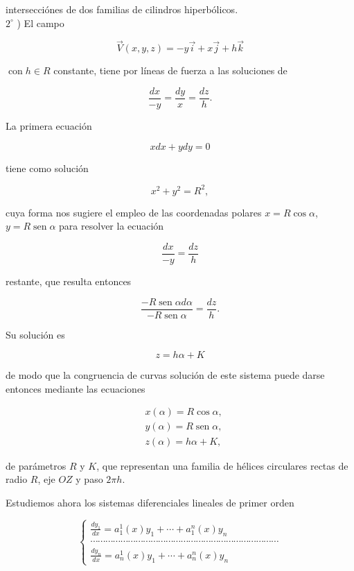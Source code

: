 \documentclass[10pt]{article}
\theoremstyle{plain}
\theoremstyle{definition}
\theoremstyle{remark}
\begin{document}
intersecciónes de dos familias de cilindros hiperbólicos.\\
$2^{\circ}$ ) El campo

$$
\vec{V}(x, y, z)=-y \vec{i}+x \vec{j}+h \vec{k}
$$

$\operatorname{con} h \in R$ constante, tiene por líneas de fuerza a las soluciones de

$$
\frac{d x}{-y}=\frac{d y}{x}=\frac{d z}{h} .
$$

La primera ecuación

$$
x d x+y d y=0
$$

tiene como solución

$$
x^{2}+y^{2}=R^{2},
$$

cuya forma nos sugiere el empleo de las coordenadas polares $x=R \cos \alpha$,\\
$y=R \operatorname{sen} \alpha$ para resolver la ecuación

$$
\frac{d x}{-y}=\frac{d z}{h}
$$

restante, que resulta entonces

$$
\frac{-R \operatorname{sen} \alpha d \alpha}{-R \operatorname{sen} \alpha}=\frac{d z}{h} .
$$

Su solución es

$$
z=h \alpha+K
$$

de modo que la congruencia de curvas solución de este sistema puede darse entonces mediante las ecuaciones

$$
\begin{aligned}
& x(\alpha)=R \cos \alpha, \\
& y(\alpha)=R \operatorname{sen} \alpha, \\
& z(\alpha)=h \alpha+K,
\end{aligned}
$$

de parámetros $R$ y $K$, que representan una familia de hélices circulares rectas de radio $R$, eje $O Z$ y paso $2 \pi h$.

Estudiemos ahora los sistemas diferenciales lineales de primer orden

\[
\left\{\begin{array}{l}
\frac{d y_{1}}{d x}=a_{1}^{1}(x) y_{1}+\cdots+a_{1}^{n}(x) y_{n}  \tag{13-8}\\
\cdots \cdots \cdots \cdots \cdots \cdots \cdots \cdots \cdots \cdots \cdots \cdots \cdots \cdots \cdots \cdots \cdots \cdots \cdots \cdots \cdots \cdots \cdots \cdots \cdots \\
\frac{d y_{n}}{d x}=a_{n}^{1}(x) y_{1}+\cdots+a_{n}^{n}(x) y_{n}
\end{array}\right.
\]
\end{document}
